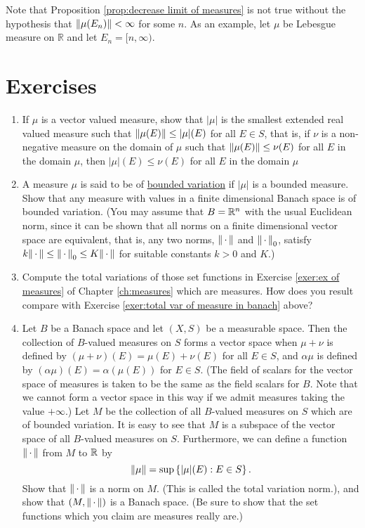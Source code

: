 Note that Proposition \ref{prop:decrease limit of measures} is not true without the hypothesis that $\norm{\mu(E_n)}<\infty$ for some $n$. As an example, let $\mu$ be Lebesgue measure on $\mathbb{R}$ and let $E_n=[n, \infty)$. 

\section{Exercises}
\begin{enumerate}[label=\arabic*),ref=\arabic*]
\item
\label{exer:total var smallest}
If $\mu$ is a vector valued measure, show that $|\mu|$ is the smallest extended real valued measure such that $\norm{\mu(E)}\leq|\mu|(E)$ for all $E \in S$, that is, if $\nu$ is a non-negative measure on the domain of $\mu$ such that $\norm{\mu(E)}\leq\nu(E)$ for all $E$ in the domain $\mu$, then $|\mu|(E)\leq\nu(E)$ for all $E$ in the domain $\mu$

\item \label{exer:total var of measure in banach}
A measure $\mu$ is said to be of \underline{bounded variation} if $|\mu|$ is a bounded measure. Show that any measure with values in a finite dimensional Banach space is of bounded variation. (You may assume that $B=\mathbb{R}^n$ with the usual Euclidean norm, since it can be shown that all norms on a finite dimensional vector space are equivalent, that is, any two norms, $\norm{\,\cdot\,}$ and $\norm{\,\cdot\,}_0$, satisfy $k\norm{\,\cdot\,}\leq\norm{\,\cdot\,}_0\leq K\norm{\,\cdot\,}$ for suitable constants $k>0$ and $K$.)

\item Compute the total variations of those set functions in Exercise \ref{exer:ex of measures} of Chapter \ref{ch:measures} which are measures. How does you result compare with Exercise \ref{exer:total var of measure in banach} above?

\item Let $B$ be a Banach space and let $(X, S)$ be a measurable space. Then the collection of $B$-valued measures on $S$ forms a vector space when $\mu+\nu$ is defined by $(\mu+\nu)(E)=\mu(E)+\nu(E)$ for all $E \in S$, and $\alpha\mu$ is defined by $(\alpha \mu)(E)=\alpha(\mu(E))$ for $E \in S$. (The field of scalars for the vector space of measures is taken to be the same as the field scalars for $B$. Note that we cannot form a vector space in this way if we admit measures taking the value $+\infty$.) Let $M$ be the collection of all $B$-valued measures on $S$ which are of bounded variation. It is easy to see that $M$ is a subspace of the vector space of all $B$-valued measures on $S$. Furthermore, we can define a function $\norm{\,\cdot\,}$ from $M$ to $\mathbb{R}$ by $$\norm{\mu}=\sup\left\{|\mu|(E):E\in S\right\}.$$ Show that $\norm{\,\cdot\,}$ is a norm on $M$. (This is called the total variation norm.), and show that $(M,\norm{\,\cdot\,})$ is a Banach space. (Be sure to show that the set functions which you claim are measures really are.)


\end{enumerate}
